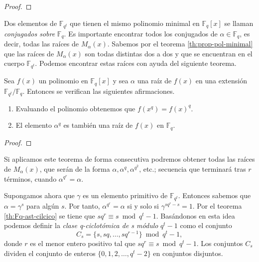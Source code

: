 \begin{proof}
\end{proof}

Dos elementos de \(\mathbb F_{q^t}\) que tienen el mismo polinomio minimal en \(\mathbb F_q[x]\) se llaman \textit{conjugados sobre} \(\mathbb F_q\).
Es importante encontrar todos los conjugados de \(\alpha \in \mathbb F_q\), es decir, todas las raíces de \(M_{\alpha}(x)\).
Sabemos por el teorema \ref{th:prop-pol-minimal} que las raíces de \(M_{\alpha}(x)\) son todas distintas dos a dos y que se encuentran en el cuerpo \(\mathbb F_{q^t}\).
Podemos encontrar estas raíces con ayuda del siguiente teorema.

\begin{theorem}
  Sea \(f(x)\) un polinomio en \(\mathbb F_q[x]\) y sea \(\alpha\) una raíz de \(f(x)\) en una extensión \(\mathbb F_{q^t}/\mathbb F_q\).
  Entonces se verifican las siguientes afirmaciones.
  \begin{enumerate}
    \item Evaluando el polinomio obtenemos que \(f(x^q) = f(x)^q\).
    \item El elemento \(\alpha^q\) es también una raíz de \(f(x)\) en \(\mathbb F_q\).
  \end{enumerate}
\end{theorem}

\begin{proof}
\end{proof}

Si aplicamos este teorema de forma consecutiva podremos obtener todas las raíces de \(M_{\alpha}(x)\), que serán de la forma \(\alpha, \alpha^q, \alpha^{q^2},\)\,etc.; secuencia que terminará tras \(r\) términos, cuando \(\alpha^{q^r} = \alpha\).

Supongamos ahora que \(\gamma\) es un elemento primitivo de \(\mathbb F_{q^t}\).
Entonces sabemos que \(\alpha = \gamma^s\) para algún \(s\).
Por tanto, \(\alpha^{q^r} = \alpha\) si y solo si \(\gamma^{sq^r - s} = 1\).
Por el teorema \ref{th:Fq-ast-cilcico} se tiene que \(sq^r \equiv s \bmod q^t - 1\).
Basándonos en esta idea podemos definir la \textit{clase q-ciclotómica de s módulo} \(q^t - 1\) como el conjunto
\[
  C_s = \{s, sq, \dots, sq^{r-1}\} \bmod q^t - 1, 
\]
donde \(r\) es el menor entero positivo tal que \(sq^r \equiv s \bmod q^t - 1\).
Los conjuntos \(C_s\) dividen el conjunto de enteros \(\{0, 1, 2, \dots, q^t - 2\}\) en conjuntos disjuntos.

